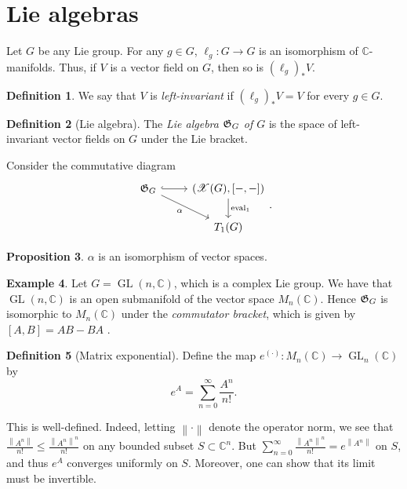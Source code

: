 \documentclass[10pt,letterpaper,cm]{nupset}
\theoremstyle{definition}
\newtheorem{defn}{Definition}[subsection]
\newtheorem{exmp}[defn]{Example}
\theoremstyle{theorem}
\newtheorem{prop}[defn]{Proposition}
\theoremstyle{remark}
\newcommand{\C}{\mathbb C}
\newcommand{\G}{\frak{G}}
\newcommand{\X}{\mathscr X}
\newcommand{\1}{\mathbb{1}}
\newcommand{\0}{\vec 0}
\DeclareMathOperator{\GL}{GL}
\DeclareMathOperator{\ev}{eval}
\begin{document}
\section{Lie algebras}

Let $G$ be any Lie group. For any $g\in G$, $\ell_g : G \to G$ is an isomorphism of $\C$-manifolds. Thus, if $V$ is a vector field on $G$, then so is $\left(\ell_g\right)_{\ast}{V}$.

\begin{defn}
We say that $V$ is \textit{left-invariant} if $\left(\ell_g\right)_{\ast}{V} = V$ for every $g\in G$.
\end{defn}

\begin{defn}[Lie algebra]
The \textit{Lie algebra $\G_G$ of $G$} is the space of left-invariant vector fields on $G$ under the Lie bracket.
\end{defn}

Consider the commutative diagram
\[
\begin{tikzcd}
\G_G \arrow[r, hook] \arrow[rd, "\alpha"'] & {\left(\X(G), \left[{-},{-}\right]\right)} \arrow[d, "\ev_1"] \\
                                         & T_1(G)                                   
\end{tikzcd}.
\]

\begin{prop}
$\alpha$ is an isomorphism of vector spaces. 
\end{prop}


\begin{exmp}
Let $G = \GL(n, \C)$, which is a complex Lie group. We have that $\GL(n, \C)$ is an open submanifold of the vector space $M_n(\C)$. Hence $\G_G$ is  isomorphic to $M_n(\C)$ under the \textit{commutator bracket}, which is given by $\left[A,B\right]= AB -BA$ .
\end{exmp}

\begin{defn}[Matrix exponential]
Define the map $e^{\left(\cdot\right)} : M_n(\C) \to \GL_n(\C)$ by 
\[
e^A  = \sum_{n=0}^{\infty} \frac{A^n }{n!}.
\]
\end{defn}

This is well-defined. Indeed, letting $\left\lVert{\cdot}\right\rVert$ denote the operator norm, we see that $\frac{\left\lVert{A^n}\right\rVert}{n!}\leq \frac{\left\lVert{A^n}\right\rVert^n}{n!}$ on any bounded subset $S\subset \C^n$. But $\sum_{n=0}^{\infty}\frac{\left\lVert{A^n}\right\rVert^n}{n!} = e^{\left\lVert{A^n}\right\rVert}$ on $S$, and thus $e^A$ converges uniformly on $S$. Moreover, one can show that its limit must be invertible.
\end{document}
